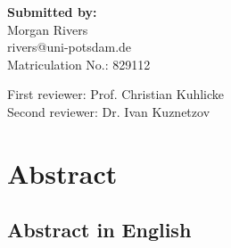 \documentclass[12pt,a4paper]{article}
\makeatletter
\newcommand{\AuthorName}{Morgan Rivers}
\newcommand{\AuthorAddressTwo}{Berlin, Germany 10559}
\newcommand{\AuthorEmail}{rivers@uni-potsdam.de}
\newcommand{\MatricNo}{829112}
\newcommand{\FirstReviewer}{Prof. Christian Kuhlicke}
\newcommand{\SecondReviewer}{Dr. Ivan Kuznetzov}
\makeatother
\begin{document}
\begin{center}
\begin{center}
        \begin{flushleft}
            \textbf{Submitted by:}\\[-0.2em]
            \AuthorName\\
            \AuthorEmail\\
            Matriculation No.: \MatricNo

            First reviewer: \FirstReviewer\\
            Second reviewer: \SecondReviewer
        \end{flushleft}

    \end{center}
    \clearpage

\end{center}
\clearpage
\hypersetup{pageanchor=true}
\section*{Abstract}
\subsection*{Abstract in English}
\newcommand{\PairwiseHuman}{51}
\newcommand{\PairwiseModel}{60}
\newcommand{\PairwiseCILow}{51}
\newcommand{\PairwiseCIHigh}{66}
\newcommand{\PairwiseModelExtrapolated}{64}

\newcommand{\Rsqfrac}{0.485}
\newcommand{\Rsqheldoutratingsllmfeatures}{-0.009}
\newcommand{\Rsqheldoutridgebaseline}{-0.053}
\newcommand{\Rsqnollmfrac}{-0.026}
\newcommand{\Rsqwithllmfrac}{-0.004}
\newcommand{\CostEffect}{54}
\newcommand{\CostCILow}{47}
\newcommand{\CostCIHigh}{62}
\end{document}
